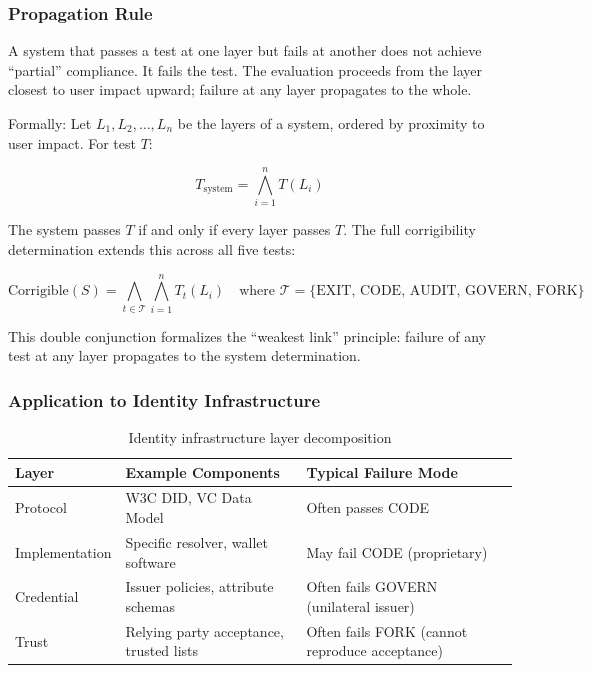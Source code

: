 \subsubsection{Propagation Rule}

A system that passes a test at one layer but fails at another does not achieve ``partial'' compliance. It fails the test. The evaluation proceeds from the layer closest to user impact upward; failure at any layer propagates to the whole.

Formally: Let $L_1, L_2, \ldots, L_n$ be the layers of a system, ordered by proximity to user impact. For test $T$:

\begin{equation}
T_{\text{system}} = \bigwedge_{i=1}^{n} T(L_i)
\label{eq:layer-propagation}
\end{equation}

The system passes $T$ if and only if every layer passes $T$. The full corrigibility determination extends this across all five tests:

\begin{equation}
\text{Corrigible}(S) = \bigwedge_{t \in \mathcal{T}} \bigwedge_{i=1}^{n} T_t(L_i) \quad \text{where } \mathcal{T} = \{\text{EXIT, CODE, AUDIT, GOVERN, FORK}\}
\label{eq:full-corrigibility}
\end{equation}

This double conjunction formalizes the ``weakest link'' principle: failure of any test at any layer propagates to the system determination.

\subsubsection{Application to Identity Infrastructure}

\begin{table}[htbp]
\centering
\small
\begin{tabular}{@{}llp{5cm}@{}}
\toprule
\textbf{Layer} & \textbf{Example Components} & \textbf{Typical Failure Mode} \\
\midrule
Protocol & W3C DID, VC Data Model & Often passes CODE \\
Implementation & Specific resolver, wallet software & May fail CODE (proprietary) \\
Credential & Issuer policies, attribute schemas & Often fails GOVERN (unilateral issuer) \\
Trust & Relying party acceptance, trusted lists & Often fails FORK (cannot reproduce acceptance) \\
\bottomrule
\end{tabular}
\caption{Identity infrastructure layer decomposition}
\label{tab:identity_layers}
\end{table}

